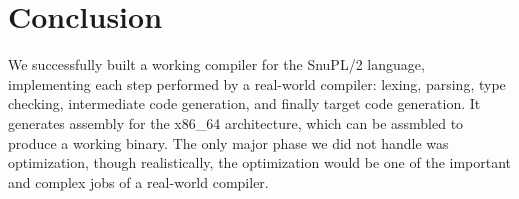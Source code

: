 \documentclass{article}
\begin{document}
\section{Conclusion}

We successfully built a working compiler for the SnuPL/2 language, implementing
each step performed by a real-world compiler: lexing, parsing, type checking,
intermediate code generation, and finally target code generation. It generates
assembly for the x86\_64 architecture, which can be assmbled to produce a
working binary. The only major phase we did not handle was optimization, though
realistically, the optimization would be one of the important and complex jobs
of a real-world compiler.
\end{document}
